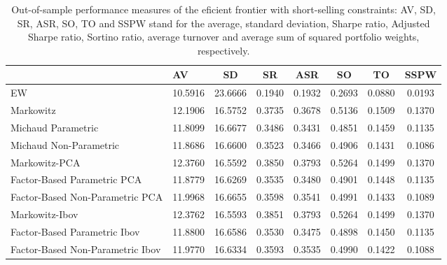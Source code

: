\begin{table}

\caption{\label{tab:empirical_ef_2}Out-of-sample performance measures of the eficient frontier with short-selling constraints: AV, SD, SR, ASR, SO, TO and SSPW stand for the average, standard deviation, Sharpe ratio, Adjusted Sharpe ratio, Sortino ratio, average turnover and average sum of squared portfolio weights, respectively.}
\centering
\begin{tabular}[t]{l|l|c|c|c|c|c|c}
\hline
  & AV & SD & SR & ASR & SO & TO & SSPW\\
\hline
EW & 10.5916 & 23.6666 & 0.1940 & 0.1932 & 0.2693 & 0.0880 & 0.0193\\
\hline
Markowitz & 12.1906 & 16.5752 & 0.3735 & 0.3678 & 0.5136 & 0.1509 & 0.1370\\
\hline
Michaud Parametric & 11.8099 & 16.6677 & 0.3486 & 0.3431 & 0.4851 & 0.1459 & 0.1135\\
\hline
Michaud Non-Parametric & 11.8686 & 16.6600 & 0.3523 & 0.3466 & 0.4906 & 0.1431 & 0.1086\\
\hline
Markowitz-PCA & 12.3760 & 16.5592 & 0.3850 & 0.3793 & 0.5264 & 0.1499 & 0.1370\\
\hline
Factor-Based Parametric PCA & 11.8779 & 16.6269 & 0.3535 & 0.3480 & 0.4901 & 0.1448 & 0.1135\\
\hline
Factor-Based Non-Parametric PCA & 11.9968 & 16.6655 & 0.3598 & 0.3541 & 0.4991 & 0.1433 & 0.1089\\
\hline
Markowitz-Ibov & 12.3762 & 16.5593 & 0.3851 & 0.3793 & 0.5264 & 0.1499 & 0.1370\\
\hline
Factor-Based Parametric Ibov & 11.8800 & 16.6586 & 0.3530 & 0.3475 & 0.4898 & 0.1450 & 0.1135\\
\hline
Factor-Based Non-Parametric Ibov & 11.9770 & 16.6334 & 0.3593 & 0.3535 & 0.4990 & 0.1422 & 0.1088\\
\hline
\end{tabular}
\end{table}
